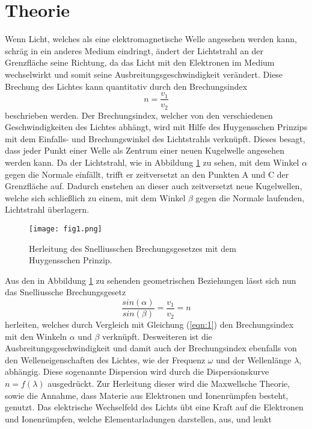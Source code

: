 \section{Theorie}
\label{sec:Theorie}
Wenn Licht, welches als eine elektromagnetische Welle angesehen werden kann, schräg in ein anderes Medium eindringt, ändert der Lichtstrahl an der Grenzfläche
seine Richtung, da das Licht mit den Elektronen im Medium wechselwirkt und somit seine Ausbreitungsgeschwindigkeit verändert. Diese Brechung des Lichtes kann
quantitativ durch den Brechungsindex
\begin{equation}
n=\frac{v_1}{v_2}
\label{eqn:1}
\end{equation}
beschrieben werden. Der Brechungsindex, welcher von den verschiedenen Geschwindigkeiten des Lichtes abhängt, wird mit Hilfe des Huygensschen Prinzips mit dem
Einfalls- und Brechungswinkel des Lichtstrahls verknüpft. Dieses besagt, dass jeder Punkt einer Welle als Zentrum einer neuen Kugelwelle angesehen werden kann.
Da der Lichtstrahl, wie in Abbildung \ref{fig:1} zu sehen, mit dem Winkel $\alpha$ gegen die Normale einfällt, trifft er zeitversetzt an den Punkten A und C
der Grenzfläche auf. Dadurch enstehen an dieser auch zeitversetzt neue Kugelwellen, welche sich schließlich zu einem, mit dem Winkel $\beta$ gegen die Normale
laufenden, Lichtstrahl überlagern.
\begin{figure}
  \centering
  \texttt{[image: fig1.png]}
  \caption{Herleitung des Snelliusschen Brechungsgesetzes mit dem Huygensschen Prinzip. \cite{1}}
  \label{fig:1}
\end{figure}
Aus den in Abbildung \ref{fig:1} zu sehenden geometrischen Beziehungen lässt sich nun das Snelliussche Brechungsgesetz
\begin{equation}
\frac{sin(\alpha)}{sin(\beta)} = \frac{v_1}{v_2} = n
\label{eqn:2}
\end{equation}
herleiten, welches durch Vergleich mit Gleichung (\ref{eqn:1}) den Brechungsindex mit den Winkeln $\alpha$ und $\beta$ verknüpft.
Desweiteren ist die Ausbreitungsgeschwindigkeit und damit auch der Brechungsindex ebenfalls von den Welleneigenschaften  des Lichtes, wie der Frequenz $\omega$ und der
Wellenlänge $\lambda$, abhängig.
Diese sogenannte Dispersion wird durch die Dispersionskurve $n=f(\lambda)$ ausgedrückt.
Zur Herleitung dieser wird die Maxwellsche Theorie, sowie die Annahme, dass Materie aus Elektronen und Ionenrümpfen besteht, genutzt.
Das elektrische Wechselfeld des Lichts übt eine Kraft auf die Elektronen und Ionenrümpfen, welche Elementarladungen darstellen, aus, und lenkt
